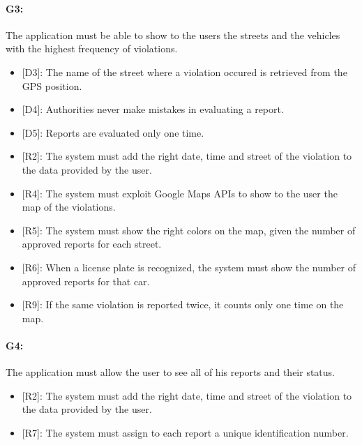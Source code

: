 \documentclass[12pt,a4paper]{report}
\begin{document}
			\paragraph {G3:} The application must be able to show to the users the streets and the vehicles with the highest frequency of violations.
			\begin{itemize}
				\item{[D3]:} The name of the street where a violation occured is retrieved from the GPS position.
				\item{[D4]:} Authorities never make mistakes in evaluating a report.
				\item{[D5]:} Reports are evaluated only one time.
			\end{itemize}
			\begin{itemize}
				\item{[R2]:} The system must add the right date, time and street of the violation to the data provided by the user.
				\item{[R4]:} The system must exploit Google Maps APIs to show to the user the map of the violations.
				\item{[R5]:} The system must show the right colors on the map, given the number of approved reports for each street.
				\item{[R6]:} When a license plate is recognized, the system must show the number of approved reports for that car.
				\item{[R9]:} If the same violation is reported twice, it counts only one time on the map.
			\end{itemize}
				\paragraph {G4:}  The application must allow the user to see all of his reports and their status.
			\begin{itemize}
				\item{[R2]:} The system must add the right date, time and street of the violation to the data provided by the user.
				\item{[R7]:} The system must assign to each report a unique identification number.
			\end{itemize}
\end{document}
